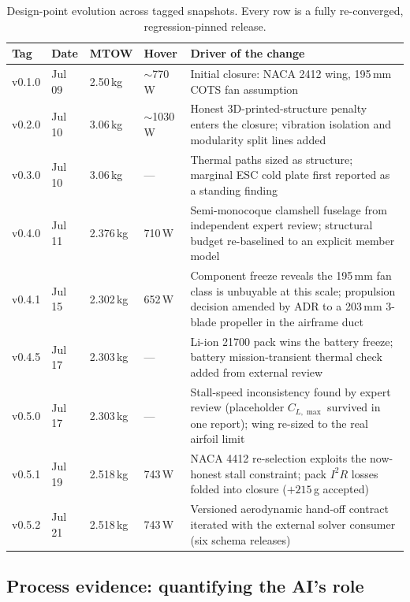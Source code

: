 \begin{table}[htbp]
\centering
\caption{Design-point evolution across tagged snapshots. Every row is
a fully re-converged, regression-pinned release.}
\label{tab:evolution}
\small
\begin{tabularx}{\textwidth}{@{}llllX@{}}
\toprule
\textbf{Tag} & \textbf{Date} & \textbf{MTOW} & \textbf{Hover} &
\textbf{Driver of the change} \\
\midrule
v0.1.0 & Jul 09 & 2.50\,kg & $\sim$770\,W &
Initial closure: NACA 2412 wing, 195\,mm COTS fan assumption \\
v0.2.0 & Jul 10 & 3.06\,kg & $\sim$1030\,W &
Honest 3D-printed-structure penalty enters the closure; vibration
isolation and modularity split lines added \\
v0.3.0 & Jul 10 & 3.06\,kg & --- &
Thermal paths sized as structure; marginal ESC cold plate first
reported as a standing finding \\
v0.4.0 & Jul 11 & 2.376\,kg & 710\,W &
Semi-monocoque clamshell fuselage from independent expert review;
structural budget re-baselined to an explicit member model \\
v0.4.1 & Jul 15 & 2.302\,kg & 652\,W &
Component freeze reveals the 195\,mm fan class is unbuyable at this
scale; propulsion decision amended by ADR to a 203\,mm 3-blade
propeller in the airframe duct \\
v0.4.5 & Jul 17 & 2.303\,kg & --- &
Li-ion 21700 pack wins the battery freeze; battery mission-transient
thermal check added from external review \\
v0.5.0 & Jul 17 & 2.303\,kg & --- &
Stall-speed inconsistency found by expert review (placeholder
$C_{L,\max}$ survived in one report); wing re-sized to the real
airfoil limit \\
v0.5.1 & Jul 19 & 2.518\,kg & 743\,W &
NACA 4412 re-selection exploits the now-honest stall constraint;
pack $I^2R$ losses folded into closure ($+215$\,g accepted) \\
v0.5.2 & Jul 21 & 2.518\,kg & 743\,W &
Versioned aerodynamic hand-off contract iterated with the external
solver consumer (six schema releases) \\
\bottomrule
\end{tabularx}
\end{table}

\subsection{Process evidence: quantifying the AI's role}
\label{sec:process-results}

